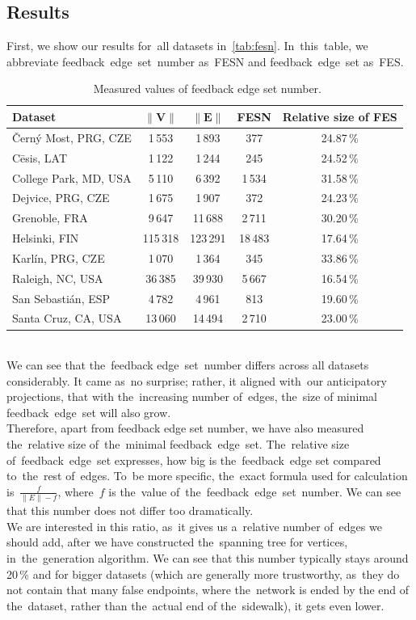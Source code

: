 \subsection{Results}
First, we show our results for~all datasets in~\autoref{tab:fesn}. In~this~table, we abbreviate feedback~edge~set~number as~FESN and feedback~edge~set as~FES.
\begin{table}[h!]
\centering
\caption[Measured values of feedback edge set number]{~Measured values of feedback edge set number.}\label{tab:fesn}
\begin{tabular}{l|c|c|c|c}
	\textbf{Dataset}		& $\|\mathbf{V}\|$		& $\|\mathbf{E}\|$& \textbf{FESN}   & \textbf{Relative size of FES}\tabularnewline \hline \hline
 	Černý Most, PRG, CZE & 1\,553	& 1\,893 & 377 & 24.87\,\%\tabularnewline \hline
 	Cēsis, LAT	& 1\,122	& 1\,244	& 245 & 24.52\,\%	\tabularnewline \hline
 	College Park, MD, USA & 5\,110 & 6\,392 & 1\,534 & 31.58\,\%	\tabularnewline \hline
 	Dejvice, PRG, CZE & 1\,675 & 1\,907 & 372 & 24.23\,\%	\tabularnewline \hline
 	Grenoble, FRA & 9\,647 & 11\,688 & 2\,711 & 30.20\,\%	\tabularnewline \hline
 	Helsinki, FIN & 115\,318 & 123\,291 & 18\,483 & 17.64\,\%	\tabularnewline \hline
 	Karlín, PRG, CZE & 1\,070 & 1\,364 & 345 & 33.86\,\%	\tabularnewline \hline
 	Raleigh, NC, USA & 36\,385 & 39\,930 & 5\,667 & 16.54\,\%	\tabularnewline \hline
 	San Sebastián, ESP & 4\,782 & 4\,961 & 813 & 19.60\,\%	\tabularnewline \hline
 	Santa Cruz, CA, USA & 13\,060 & 14\,494 & 2\,710 & 23.00\,\%	\tabularnewline
\end{tabular}
\end{table}
\\
We can see that the~feedback edge~set~number differs across all datasets considerably. It came as~no surprise; rather, it aligned with~our anticipatory projections, that with the~increasing number of~edges, the~size of minimal feedback~edge~set will also grow. \\ 
Therefore, apart from feedback edge set number, we have also measured the~relative size of~the~minimal feedback~edge~set. The~relative size of~feedback~edge~set expresses, how big is the~feedback~edge set compared to~the~rest of~edges. To~be more specific, the~exact formula used for calculation is~$\frac{f}{\|E\| - f}$, where~$f$ is the~value of~the~feedback~edge~set~number. We can see that this number does not differ too dramatically. \\
We are interested in this ratio, as~it gives us a~relative number of~edges we should add, after we have constructed the~spanning tree for vertices, in~the~generation algorithm. We can see that this number typically stays around 20\,\% and for bigger datasets (which are generally more trustworthy, as~they do not contain that many false endpoints, where the~network is ended by the end of the~dataset, rather than the~actual end of the~sidewalk), it gets even lower.
